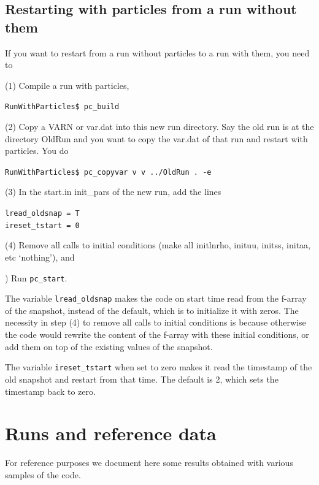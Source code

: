 \documentclass[\mydriver,12pt,twoside,notitlepage,a4paper]{article}
\newcommand{\code}[1]{\texttt{#1}}
\begin{document}
\subsection{Restarting with particles from a run without them}
\label{RestartingWithParticles}

If you want to restart from a run without particles to a run with
them, you need to 

\noindent (1) Compile a run with particles, 

\code{RunWithParticles\$ pc\_build}

\noindent (2) Copy a VARN
or var.dat into this new run directory. Say the old run is at the
directory OldRun and you want to copy the var.dat of that run and
restart with particles. You do 

\code{RunWithParticles\$ pc\_copyvar v v ../OldRun . -e }

\noindent (3) In the start.in init\_pars of the new run, add the lines 

\code{lread\_oldsnap = T}\\
\code{ireset\_tstart = 0}

\noindent (4) Remove all calls to initial conditions (make all
initlnrho, inituu, initss, initaa, etc `nothing'), and  

) Run \code{pc\_start}. 

The variable \code{lread\_oldsnap} makes the code on start time read
from the f-array of the snapshot, instead of the default, which is to
initialize it with zeros. The necessity in step (4) to remove all calls to
initial conditions is because otherwise the code would rewrite the
content of the f-array with these initial conditions, or add them on
top of the existing values of the snapshot. 

The variable \code{ireset\_tstart} when set to zero makes it read the timestamp of
the old snapshot and restart from that time. The default is 2, which
sets the timestamp back to zero. 


\section{Runs and reference data}
\label{S-ref-data}

For reference purposes we document here some results obtained with various
samples of the code.
\end{document}
